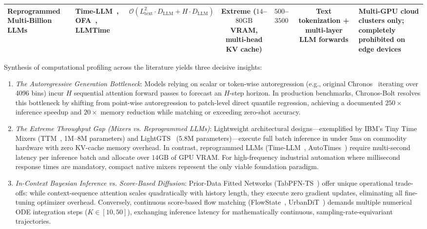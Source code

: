 \begin{table}[t]
{\begin{tabular}{lp{3.0cm}ccccp{3.2cm}}
\midrule
\textbf{Reprogrammed Multi-Billion LLMs} & Time-LLM~\cite{jin2023timellm}, OFA~\cite{zhou2023onefitsall}, LLMTime~\cite{gruver2023llmtime} & $\mathcal{O}(L_{\text{text}}^2 \cdot D_{\text{LLM}} + H \cdot D_{\text{LLM}})$ & Extreme ($14$--$80\text{GB}$ VRAM, multi-head KV cache) & $500$--$3500$ & Text tokenization + multi-layer LLM forwards & Multi-GPU cloud clusters only; completely prohibited on edge devices \\
\bottomrule
\end{tabular}
}
\end{table}

Synthesis of computational profiling across the literature yields three decisive insights:
\begin{enumerate}[leftmargin=*]
    \item \emph{The Autoregressive Generation Bottleneck}: Models relying on scalar or token-wise autoregression (e.g., original Chronos~\cite{ansari2024chronos} iterating over 4096 bins) incur $H$ sequential attention forward passes to forecast an $H$-step horizon. In production benchmarks, Chronos-Bolt resolves this bottleneck by shifting from point-wise autoregression to patch-level direct quantile regression, achieving a documented $250\times$ inference speedup and $20\times$ memory reduction while matching or exceeding zero-shot accuracy.
    \item \emph{The Extreme Throughput Gap (Mixers vs. Reprogrammed LLMs)}: Lightweight architectural designs—exemplified by IBM's Tiny Time Mixers (TTM~\cite{ekambaram2024ttm}, 1M--8M parameters) and LightGTS~\cite{wang2025lightgts} (5.8M parameters)—execute full batch inference in under $5\text{ms}$ on commodity hardware with zero KV-cache memory overhead. In contrast, reprogrammed LLMs (Time-LLM~\cite{jin2023timellm}, AutoTimes~\cite{liu2024autotimes}) require multi-second latency per inference batch and allocate over $14\text{GB}$ of GPU VRAM. For high-frequency industrial automation where millisecond response times are mandatory, compact native mixers represent the only viable foundation paradigm.
    \item \emph{In-Context Bayesian Inference vs. Score-Based Diffusion}: Prior-Data Fitted Networks (TabPFN-TS~\cite{muller2025tabpfnts}) offer unique operational trade-offs: while context-sequence attention scales quadratically with history length, they execute zero gradient updates, eliminating all fine-tuning optimizer overhead. Conversely, continuous score-based flow matching (FlowState~\cite{king2025flowstate}, UrbanDiT~\cite{li2024urbandit}) demands multiple numerical ODE integration steps ($K \in [10, 50]$), exchanging inference latency for mathematically continuous, sampling-rate-equivariant trajectories.
\end{enumerate}

